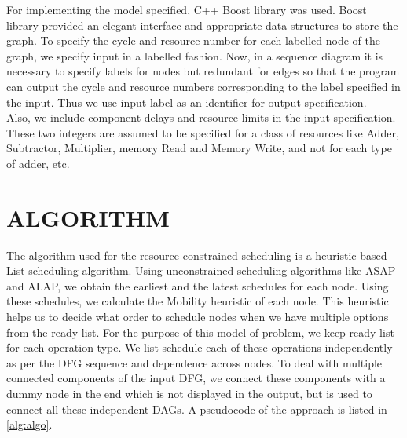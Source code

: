 \documentclass[letterpaper, 10 pt, conference]{ieeeconf}  %
\begin{document}
For implementing the model specified, C++ Boost library was used. Boost library provided an elegant interface and appropriate data-structures to store the graph. To specify the cycle and resource number for each labelled node of the graph, we specify input in a labelled fashion. Now, in a sequence diagram it is necessary to specify labels for nodes but redundant for edges so that the program can output the cycle and resource numbers corresponding to the label specified in the input. Thus we use input label as an identifier for output specification. \\
Also, we include component delays and resource limits in the input specification. These two integers are assumed to be specified for a class of resources like Adder, Subtractor, Multiplier, memory Read and Memory Write, and not for each type of adder, etc. 

\section{ALGORITHM}

The algorithm used for the resource constrained scheduling is a heuristic based List scheduling algorithm. Using unconstrained scheduling algorithms like ASAP and ALAP, we obtain the earliest and the latest schedules for each node. Using these schedules, we calculate the Mobility heuristic of each node. This heuristic helps us to decide what order to schedule nodes when we have multiple options from the ready-list. For the purpose of this model of problem, we keep ready-list for each operation type. We list-schedule each of these operations independently as per the DFG sequence and dependence across nodes. To deal with multiple connected components of the input DFG, we connect these components with a dummy node in the end which is not displayed in the output, but is used to connect all these independent DAGs. A pseudocode of the approach is listed in \ref{alg:algo}. \\
\end{document}
